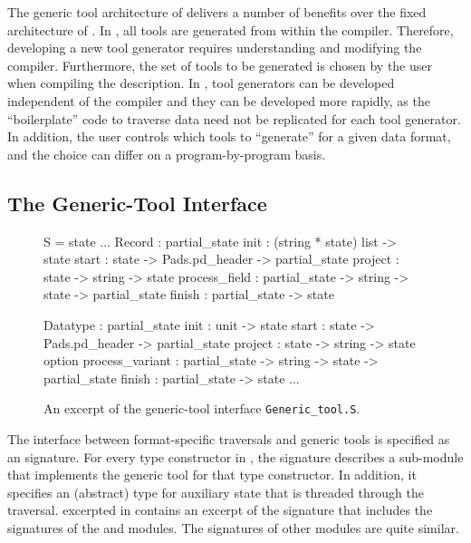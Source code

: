 The generic tool architecture of \padsml{} delivers a number of
benefits over the fixed architecture of \padsc{}. In \padsc{}, all
tools are generated from within the compiler. Therefore, developing a
new tool generator requires understanding and modifying the compiler.
Furthermore, the set of tools to be generated is chosen by the user
when compiling the description.  In \padsml{}, tool generators can be
developed independent of the compiler and they can be developed more
rapidly, as the ``boilerplate'' code to traverse data need not be
replicated for each tool generator. In addition, the user controls
which tools to ``generate'' for a given data format, and the choice
can differ on a program-by-program basis.

\subsection{The Generic-Tool Interface}
\label{sec:gentool-interface}

\begin{figure}
\begin{code}\scriptsize
{}  S = 
   state
  ...
   Record : 
     partial_state
      init          : (string * state) list -> state
      start         : state -> Pads.pd_header 
                         -> partial_state
      project       : state -> string -> state
      process_field : partial_state -> string
                         -> state -> partial_state
      finish        : partial_state -> state

   Datatype : 
     partial_state
      init            : unit -> state
      start           : state -> Pads.pd_header 
                           -> partial_state
      project         : state -> string -> state option
      process_variant : partial_state -> string 
                           -> state -> partial_state
      finish          : partial_state -> state
   ...
\end{code}
\caption{An excerpt of the generic-tool interface \texttt{Generic\_tool.S}.}
\label{fig:gentool-interface}
\end{figure}

The interface between format-specific traversals and generic tools is
specified as an \ocaml{} signature.  For every type constructor in
\padsml{}, the signature describes a sub-module that implements the
generic tool for that type constructor.  In addition, it specifies an
(abstract) type for auxiliary state that is threaded through the
traversal. excerpted in  contains an
excerpt of the signature that includes the signatures of the
 and  modules.  The signatures of other
modules are quite similar.

